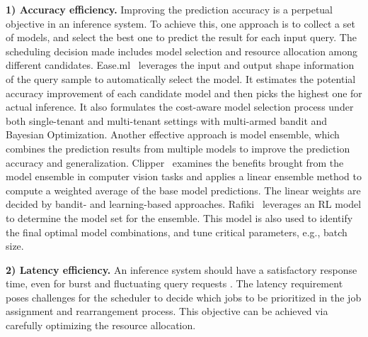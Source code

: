 \textbf{1) Accuracy efficiency.} Improving the prediction accuracy is a perpetual objective in an inference system. To achieve this, one approach is to collect a set of models, and select the best one to predict the result for each input query.
The scheduling decision made includes model selection and resource allocation among different candidates.
Ease.ml~\cite{li2018easeml} leverages the input and output shape information of the query sample to automatically select the model. It estimates the potential accuracy improvement of each candidate model and then picks the highest one for actual inference. It also formulates the cost-aware model selection process under both single-tenant and multi-tenant settings with multi-armed bandit and Bayesian Optimization. Another effective approach is model ensemble, which combines the prediction results from multiple models to improve the prediction accuracy and generalization. Clipper~\cite{Daniel2017clipper} examines the benefits brought from the model ensemble in computer vision tasks and applies a linear ensemble method to compute a weighted average of the base model predictions. The linear weights are decided by bandit- and learning-based approaches. Rafiki~\cite{wang2018rafiki} leverages an RL model to determine the model set for the ensemble. This model is also used to identify the final optimal model combinations, and tune critical parameters, e.g., batch size.









\textbf{2) Latency efficiency.}
An inference system should have a satisfactory response time, even for burst and fluctuating query requests {\tiny{}}.
The latency requirement poses challenges for the scheduler to decide which jobs to be prioritized in the job assignment and rearrangement process.
This objective can be achieved via carefully optimizing the resource allocation.

